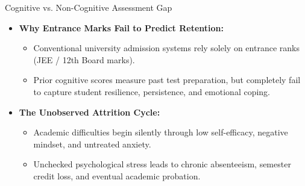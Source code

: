 \documentclass{beamer}
\begin{document}
\begin{frame}{Cognitive vs. Non-Cognitive Assessment Gap}
  \begin{itemize}\setlength{\itemsep}{8pt}
    \item \textbf{Why Entrance Marks Fail to Predict Retention:}
    \begin{itemize}\setlength{\itemsep}{4pt}
      \item Conventional university admission systems rely solely on entrance ranks (JEE / 12th Board marks).
      \item Prior cognitive scores measure past test preparation, but completely fail to capture student resilience, persistence, and emotional coping.
    \end{itemize}
    
    \item \textbf{The Unobserved Attrition Cycle:}
    \begin{itemize}\setlength{\itemsep}{4pt}
      \item Academic difficulties begin silently through low self-efficacy, negative mindset, and untreated anxiety.
      \item Unchecked psychological stress leads to chronic absenteeism, semester credit loss, and eventual academic probation.
    \end{itemize}
  \end{itemize}
\end{frame}
\end{document}
